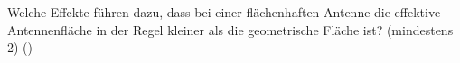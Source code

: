 \begin{question}[section=,name={},difficulty=,quantity=,type=thr,tags={20160310}]
	Welche Effekte führen dazu, dass bei einer flächenhaften Antenne die effektive Antennenfläche in der Regel kleiner als die geometrische Fläche ist? (mindestens 2) ()
	
\end{question}
\begin{solution}
	
\end{solution}